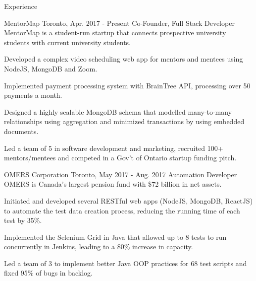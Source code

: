 \documentclass{resume} %
\begin{document}
\begin{rSection}{Experience}

\begin{expSec}
{MentorMap}
{Toronto, Apr. 2017 - Present}
{Co-Founder, Full Stack Developer \href{https://www.mentormap.ca/}{\space\small\faExternalLink}}
{MentorMap is a student-run startup that connects prospective university students with current university students.}
\item Developed a complex video scheduling web app for mentors and mentees using NodeJS, MongoDB and Zoom.
\item Implemented payment processing system with BrainTree API, processing over 50 payments a month.
\item Designed a highly scalable MongoDB schema that modelled many-to-many relationships using aggregation and minimized transactions by using embedded documents.
\item Led a team of 5 in software development and marketing, recruited 100+ mentors/mentees and competed in a Gov't of Ontario startup funding pitch.
\end{expSec}

\begin{expSec}
{OMERS Corporation}
{Toronto, May 2017 - Aug. 2017}
{Automation Developer \href{http://www.omers.com/}{\space\small\faExternalLink}}
{OMERS is Canada's largest pension fund with \$72 billion in net assets.}
\item Initiated and developed several RESTful web apps \href{https://github.com/jsun98/OMERS_DataCreation}{\small\faGithub}
(NodeJS, MongoDB, ReactJS) to automate the test data creation process, reducing the running time of each test by 35\%.
\item Implemented the Selenium Grid in Java that allowed up to 8 tests to run concurrently in Jenkins, leading to a 80\% increase in capacity.
\item Led a team of 3 to implement better Java OOP practices for 68 test scripts and fixed 95\% of bugs in backlog.
\end{expSec}



\end{rSection}


\end{document}
